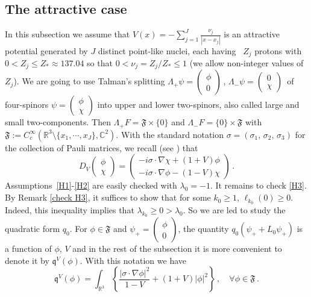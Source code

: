 \documentclass[12pt,reqno]{amsart}
\newcommand{\R}{{\mathbb R}}
\newcommand{\C}{{\mathbb C}}
\newcommand{\be}[1]{\begin{equation}\label{#1}}
\newcommand{\ee}{\end{equation}}
\renewcommand{\(}{\left(}
\renewcommand{\)}{\right)}
\begin{document}
\subsection{The attractive case}\label{subsection: attractive}
In this subsection we assume that $V(x)=-\sum_{j=1}^J\frac{\nu_j}{|x-x_j|}$ is an attractive potential generated by $J$ distinct point-like nuclei, each having ~$Z_j$ protons with $0<Z_j \leq Z_*\approx137.04$ so that $0<\nu_j=Z_j/Z_*\leq 1$ (we allow non-integer values of $Z_j$). We are going to use Talman's splitting $\Lambda_+\psi=\begin{pmatrix} \phi \\ 0\end{pmatrix}\,$, $\Lambda_-\psi=\begin{pmatrix} 0 \\ \chi\end{pmatrix}\,$ of four-spinors $\psi=\begin{pmatrix} \phi \\ \chi\end{pmatrix}$ into upper and lower two-spinors, also called large and small two-components. Then $\Lambda_+F=\mathfrak{F}\times\{0\}$ and $\Lambda_-F=\{0\}\times\mathfrak{F}$ with $\mathfrak{F}:=C^\infty_c(\R^3\setminus\{x_1,\cdots,x_J\}, \C^2)$.
With the standard notation $\sigma=(\sigma_1,\,\sigma_2,\,\sigma_3)$ for the collection of Pauli matrices, we recall (see \cite{thaller}) that
\[D_V\begin{pmatrix} \phi \\ \chi\end{pmatrix}=\begin{pmatrix} -i\sigma\cdot\nabla\chi+(1+V)\phi \\ -i\sigma\cdot\nabla\phi-(1-V)\chi\end{pmatrix}\,.\]
Assumptions~\eqref{H1}-\eqref{H2} are easily checked with $\lambda_0=-1$.
It remains to check \eqref{H3}. By Remark \ref{check H3}, it suffices to show that for some $k_0\geq 1$, $\ell_{k_0}(0)\geq 0$. Indeed, this inequality implies that $\lambda_{k_0}\geq 0>\lambda_0$. So we are led to study the quadratic form $q_0$. For $\phi\in \mathfrak{F}$ and $\psi_+=\begin{pmatrix} \phi \\ 0\end{pmatrix}$, the quantity $q_0(\psi_++L_0\psi_+)$ is a function of $\phi,\,V$ and in the rest of the subsection it is more convenient to denote it by $\mathfrak{q}^V(\phi)$. With this notation we have
\be{q0}\mathfrak{q}^V(\phi)=\int_{\R^3}\left\{\frac{\vert \sigma\cdot\nabla\phi\vert^2}{1-V}+\left(1+V\right)\vert\phi\vert^2\right\}\,,\quad \forall \phi\in\mathfrak{F}\,.
\ee
\end{document}
